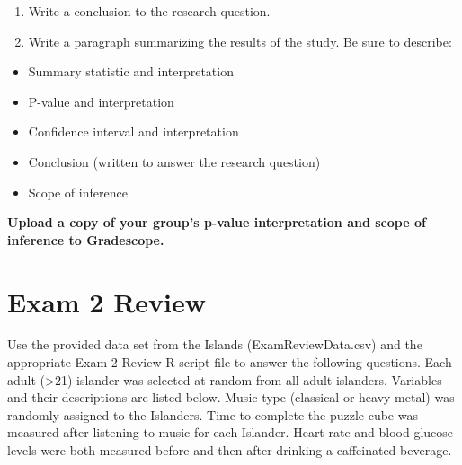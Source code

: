 \documentclass[
]{report}
\begin{document}
\vspace{0.8in}

\begin{enumerate}
\def\labelenumi{\arabic{enumi}.}
\setcounter{enumi}{13}
\item
  Write a conclusion to the research question.
  \vspace{0.8in}
\item
  Write a paragraph summarizing the results of the study. Be sure to describe:
\end{enumerate}

\begin{itemize}
\item
  Summary statistic and interpretation
\item
  P-value and interpretation
\item
  Confidence interval and interpretation
\item
  Conclusion (written to answer the research question)
\item
  Scope of inference
\end{itemize}

\textbf{Upload a copy of your group's p-value interpretation and scope of inference to Gradescope.}

\newpage

\hypertarget{exam-2-review}{%
\chapter{Exam 2 Review}\label{exam-2-review}}

Use the provided data set from the Islands (ExamReviewData.csv) and the appropriate Exam 2 Review R script file to answer the following questions. Each adult (\textgreater21) islander was selected at random from all adult islanders. Variables and their descriptions are listed below. Music type (classical or heavy metal) was randomly assigned to the Islanders. Time to complete the puzzle cube was measured after listening to music for each Islander. Heart rate and blood glucose levels were both measured before and then after drinking a caffeinated beverage.
\end{document}
